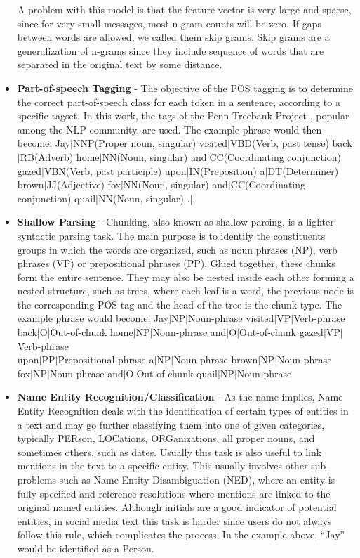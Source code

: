 \begin{itemize}
        A problem with this model is that the feature vector is very large and sparse, since for very small messages, most n-gram counts will be zero. If gaps between words are allowed, we called them skip grams. Skip grams are a generalization of n-grams since they include sequence of words that are separated in the original text by some distance.  
        \item \textbf{Part-of-speech Tagging} - The objective of the POS tagging is to determine the correct part-of-speech class for each token in a sentence, according to a specific tagset. In this work, the tags of the Penn Treebank Project \citep{MitchellPennTreebank1993}, popular among the NLP community, are used. The example phrase would then become: Jay$|$NNP(Proper noun, singular) visited$|$VBD(Verb, past tense) back$|$RB(Adverb) home$|$NN(Noun, singular) and$|$CC(Coordinating conjunction) gazed$|$VBN(Verb, past participle) upon$|$IN(Preposition) a$|$DT(Determiner)\\ brown$|$JJ(Adjective) fox$|$NN(Noun, singular) and$|$CC(Coordinating conjunction) quail$|$NN(Noun, singular) .$|$.
        \item \textbf{Shallow Parsing} - Chunking, also known as shallow parsing, is a lighter syntactic parsing task. The main purpose is to identify the constituents groups in which the words are organized, such as noun phrases (NP), verb phrases (VP) or prepositional phrases (PP). Glued together, these chunks form the entire sentence. They may also be nested inside each other forming a nested structure, such as trees, where each leaf is a word, the previous node is the corresponding POS tag and the head of the tree is the chunk type. The example phrase would become: Jay$|$NP$|$Noun-phrase
visited$|$VP$|$Verb-phrase back$|$O$|$Out-of-chunk home$|$NP$|$Noun-phrase and$|$O$|$Out-of-chunk gazed$|$VP$|$Verb-phrase\\
upon$|$PP$|$Prepositional-phrase a$|$NP$|$Noun-phrase brown$|$NP$|$Noun-phrase\\
fox$|$NP$|$Noun-phrase and$|$O$|$Out-of-chunk quail$|$NP$|$Noun-phrase
		\item \textbf{Name Entity Recognition/Classification} - As the name implies, Name Entity Recognition deals with the identification of certain types of entities in a text and may go further classifying them into one of given categories, typically PERson, LOCations, ORGanizations, all proper nouns, and sometimes others, such as dates. Usually this task is also useful to link mentions in the text to a specific entity. This usually involves other sub-problems such as Name Entity Disambiguation (NED), where an entity is fully specified and reference resolutions where mentions are linked to the original named entities. Although initials are a good indicator of potential entities, in social media text this task is harder since users do not always follow this rule, which complicates the process. In the example above, ``Jay'' would be identified as a Person.

\end{itemize}

